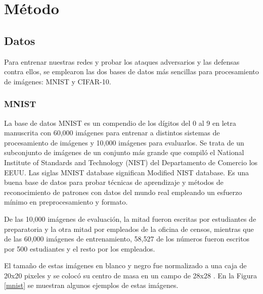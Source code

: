\section{Método}

\subsection{Datos}
Para entrenar nuestras redes y probar los ataques adversarios y las defensas contra ellos, se emplearon las dos bases de datos más sencillas para procesamiento de imágenes: MNIST y CIFAR-10.

\subsubsection{MNIST}
La base de datos MNIST es un compendio de los dígitos del 0 al 9 en letra manuscrita con 60,000 imágenes para entrenar a distintos sistemas de procesamiento de imágenes y 10,000 imágenes para evaluarlos. Se trata de un subconjunto de imágenes de un conjunto más grande que compiló el National Institute of Standards and Technology (NIST) del Departamento de Comercio los EEUU. Las siglas MNIST database significan Modified NIST database. Es una buena base de datos para probar técnicas de aprendizaje y métodos de reconocimiento de patrones con datos del mundo real empleando un esfuerzo mínimo en preprocesamiento y formato.

De las 10,000 imágenes de evaluación, la mitad fueron escritas por estudiantes de preparatoria y la otra mitad por empleados de la oficina de censos, mientras que de las 60,000 imágenes de entrenamiento, 58,527 de los números fueron escritos por 500 estudiantes y el resto por los empleados.

El tamaño de estas imágenes en blanco y negro fue normalizado a una caja de 20x20 pixeles y se colocó su centro de masa en un campo de 28x28 \cite{lecun2010mnist}. En la Figura \ref{mnist} se muestran algunos ejemplos de estas imágenes.

